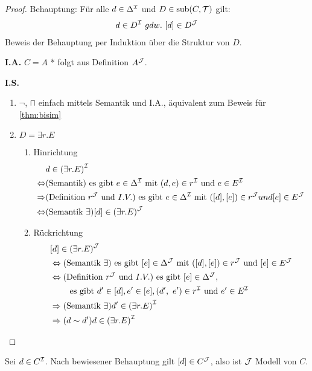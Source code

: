 \begin{tafel}\mbox{}
\begin{proof}
    Behauptung:
Für alle $d \in \Delta^{\mathcal{I}}$ und $D \in \operatorname{sub}(C,\mathcal{T})$ gilt:
\begin{align*}
d \in D^\MI\ gdw.\ \left\lbrack d \right\rbrack \in D^{\MJ}
\end{align*}
Beweis der Behauptung per Induktion über die Struktur von $D$.

\textbf{I.A.} $C = A$ * folgt aus Definition $A^{\mathcal{J}}$.

\textbf{I.S.}

\begin{enumerate}
    \item $\neg$, $\sqcap$ einfach mittels Semantik und I.A., äquivalent zum Beweis für \autoref{thm:bisim}
\item $D = \exists r.E$
  \begin{enumerate}
  \def\labelenumi{\alph{enumi}.}
  \def\labelenumii{\alph{enumii}.}
  \item Hinrichtung
      \begin{align*}
          &d \in \left( \exists r.E \right)^\MI\\
          \Leftrightarrow &(\text{Semantik})\text{ es gibt }e \in \Delta^\MI \text{ mit } \left( d,e \right) \in r^\MI \text{ und } e \in E^\MI \\
          \Rightarrow &(\text{Definition }r^{\MJ} \text{ und } I.V.) \text{ es gibt }e \in \Delta^\MI \text{ mit }\left( \left\lbrack d \right\rbrack,\left\lbrack e \right\rbrack \right) \in r^{\MJ} und \left\lbrack e \right\rbrack \in E^{\MJ} \\
          \Leftrightarrow &(\text{Semantik } \exists) \left\lbrack d \right\rbrack \in \left( \exists r.E \right)^{\MJ}
      \end{align*}
    \item Rückrichtung
        \begin{align*}
            &\left\lbrack d \right\rbrack \in \left( \exists r.E \right)^{\MJ} \\
            &\Leftrightarrow (\text{Semantik }\exists) \text{ es gibt }[e] \in \Delta^{\MJ} \text{ mit } \left( \left\lbrack d \right\rbrack,\left\lbrack e \right\rbrack \right) \in r^{\MJ}\text{ und }\left\lbrack e \right\rbrack \in E^{\MJ} \\
            &\Leftrightarrow (\text{Definition }r^{\MJ} \text{ und }I.V.) \text{ es gibt }[e] \in \Delta^{\MJ},\\
            &\quad\quad\text{ es gibt }d' \in \left\lbrack d \right\rbrack, e' \in \left\lbrack e \right\rbrack, \left( d',\ e' \right) \in r^\MI \text{ und }e' \in E^\MI \\
            &\Rightarrow (\text{Semantik }\exists) d' \in \left( \exists r.E \right)^\MI \\
            &\Rightarrow (d \sim d') d \in \left( \exists r.E \right)^\MI
        \end{align*}
\end{enumerate}
\end{enumerate}
\end{proof}
Sei $d \in C^{\mathcal{I}}$. Nach bewiesener Behauptung gilt $[d] \in C^{\mathcal{J}}$, also ist $\mathcal{J}$ Modell von $C$.


\end{tafel}
